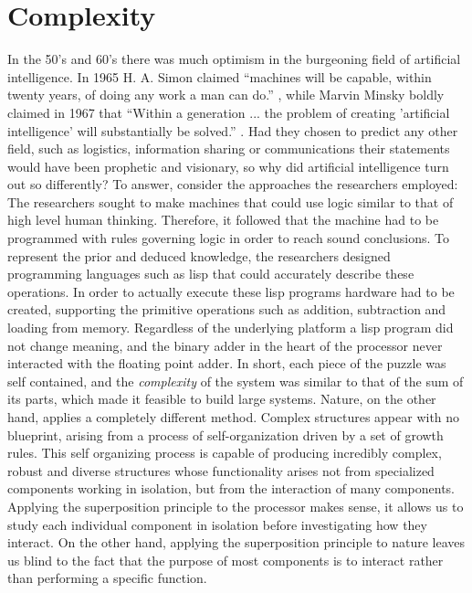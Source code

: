 \section{Complexity}
In the 50's and 60's there was much optimism in the burgeoning field of
artificial intelligence. In 1965 H. A. Simon claimed ``machines will be capable,
within twenty years, of doing any work a man can
do.''\cite{vardi_artificial_nodate} , while Marvin Minsky boldly claimed in 1967
that ``Within a generation ... the problem of creating 'artificial intelligence'
will substantially be solved.'' \cite{noauthor_marvin_nodate}.
Had they chosen to predict any other field, such as logistics, information
sharing or communications their statements would have been prophetic and
visionary, so why did artificial intelligence turn out so differently?
%
To answer, consider the approaches the researchers employed:\\
The researchers sought to make machines that could use logic similar to that of
high level human thinking.
%
Therefore, it followed that the machine had to be programmed with rules
governing logic in order to reach sound conclusions.
%
To represent the prior and deduced knowledge, the researchers designed
programming languages such as lisp that could accurately describe these
operations.
%
In order to actually execute these lisp programs hardware had to be created,
supporting the primitive operations such as addition, subtraction and loading
from memory.
Regardless of the underlying platform a lisp program did not change meaning, and
the binary adder in the heart of the processor never interacted with the
floating point adder. In short, each piece of the puzzle was self contained,
and the \emph{complexity} of the system was similar to that of the sum of its
parts, which made it feasible to build large systems.
%
Nature, on the other hand, applies a completely different method.
Complex structures appear with no blueprint, arising from a process of
self-organization driven by a set of growth rules. This self organizing process
is capable of producing incredibly complex, robust and diverse structures whose
functionality arises not from specialized components working in isolation, but
from the interaction of many components.
%
Applying the superposition principle to the processor makes sense, it allows us
to study each individual component in isolation before investigating how they
interact.
%
On the other hand, applying the superposition principle to nature leaves us
blind to the fact that the purpose of most components is to interact rather than
performing a specific function.
